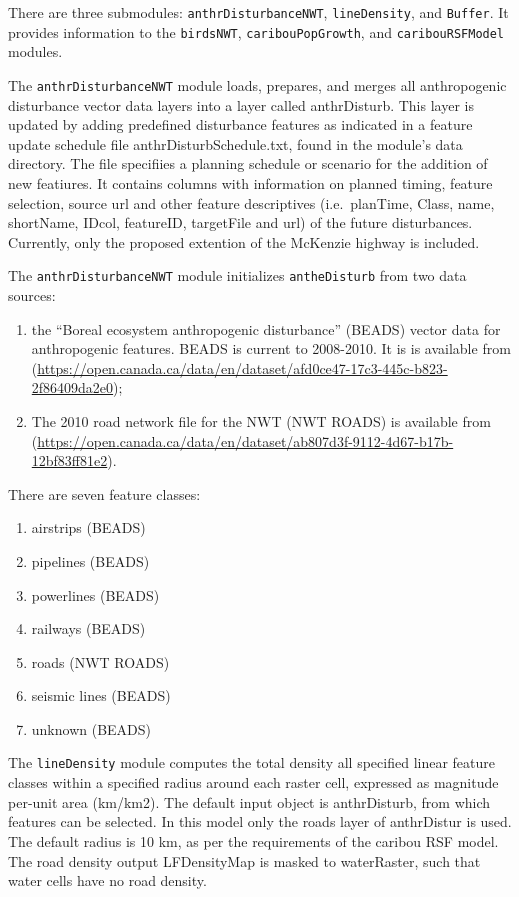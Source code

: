 \documentclass[]{article}
\providecommand{\tightlist}{%
  \setlength{\itemsep}{0pt}\setlength{\parskip}{0pt}}
\begin{document}
There are three submodules: \texttt{anthrDisturbanceNWT},
\texttt{lineDensity}, and \texttt{Buffer}. It provides information to
the \texttt{birdsNWT}, \texttt{caribouPopGrowth}, and
\texttt{caribouRSFModel} modules.

The \texttt{anthrDisturbanceNWT} module loads, prepares, and merges all
anthropogenic disturbance vector data layers into a layer called
anthrDisturb. This layer is updated by adding predefined disturbance
features as indicated in a feature update schedule file
anthrDisturbSchedule.txt, found in the module's data directory. The file
specifiies a planning schedule or scenario for the addition of new
featiures. It contains columns with information on planned timing,
feature selection, source url and other feature descriptives
(i.e.~planTime, Class, name, shortName, IDcol, featureID, targetFile and
url) of the future disturbances. Currently, only the proposed extention
of the McKenzie highway is included.

The \texttt{anthrDisturbanceNWT} module initializes
\texttt{antheDisturb} from two data sources:

\begin{enumerate}
\def\labelenumi{\arabic{enumi}.}
\tightlist
\item
  the ``Boreal ecosystem anthropogenic disturbance'' (BEADS) vector data
  for anthropogenic features. BEADS is current to 2008-2010. It is is
  available from
  (\url{https://open.canada.ca/data/en/dataset/afd0ce47-17c3-445c-b823-2f86409da2e0});
\item
  The 2010 road network file for the NWT (NWT ROADS) is available from
  (\url{https://open.canada.ca/data/en/dataset/ab807d3f-9112-4d67-b17b-12bf83ff81e2}).
\end{enumerate}

There are seven feature classes:

\begin{enumerate}
\def\labelenumi{\arabic{enumi}.}
\tightlist
\item
  airstrips (BEADS)
\item
  pipelines (BEADS)
\item
  powerlines (BEADS)
\item
  railways (BEADS)
\item
  roads (NWT ROADS)
\item
  seismic lines (BEADS)
\item
  unknown (BEADS)
\end{enumerate}

The \texttt{lineDensity} module computes the total density all specified
linear feature classes within a specified radius around each raster
cell, expressed as magnitude per-unit area (km/km2). The default input
object is anthrDisturb, from which features can be selected. In this
model only the roads layer of anthrDistur is used. The default radius is
10 km, as per the requirements of the caribou RSF model. The road
density output LFDensityMap is masked to waterRaster, such that water
cells have no road density.
\end{document}
